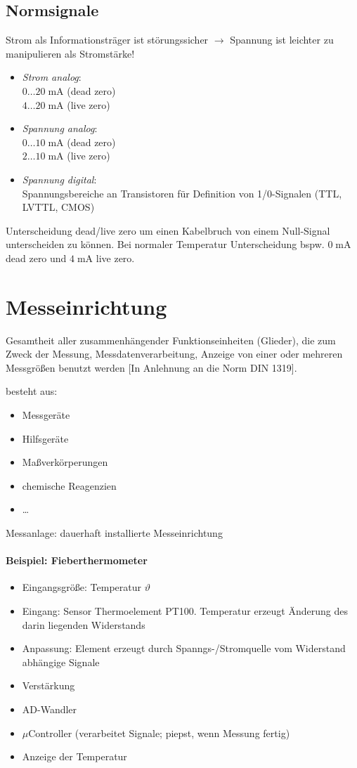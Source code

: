 \subsection{Normsignale}
Strom als Informationsträger ist störungssicher $\to$ Spannung ist leichter zu manipulieren als Stromstärke!
\begin{itemize}
\item \emph{Strom analog}:\\
$0\dots 20\; \mathrm{mA}$ (dead zero)\\
$4 \dots 20 \;\mathrm{mA}$ (live zero)
\item \emph{Spannung analog}:\\
$0\dots 10 \;\mathrm{mA}$ (dead zero)\\
$2 \dots 10 \;\mathrm{mA}$ (live zero)
\item \emph{Spannung digital}:\\
Spannungsbereiche an Transistoren für Definition von 1/0-Signalen (TTL, LVTTL, CMOS)
\end{itemize}
Unterscheidung dead/live zero um einen Kabelbruch von einem Null-Signal unterscheiden zu können. Bei normaler Temperatur Unterscheidung bspw. $0\;\mathrm{mA}$ dead zero und $4 \;\mathrm{mA}$ live zero.

\section{Messeinrichtung}
Gesamtheit aller zusammenhängender Funktionseinheiten (Glieder), die zum Zweck der Messung, Messdatenverarbeitung, Anzeige von einer oder mehreren Messgrößen benutzt werden [In Anlehnung an die Norm DIN 1319].

besteht aus:
\begin{itemize}
\item Messgeräte
\item Hilfsgeräte
\item Maßverkörperungen
\item chemische Reagenzien
\item …
\end{itemize}
Messanlage: dauerhaft installierte Messeinrichtung

\paragraph{Beispiel: Fieberthermometer}
\begin{itemize}
\item Eingangsgröße: Temperatur $\vartheta$
\item Eingang: Sensor Thermoelement PT100. Temperatur erzeugt Änderung des darin liegenden Widerstands 
\item Anpassung: Element erzeugt durch Spanngs-/Stromquelle vom Widerstand abhängige Signale
\item Verstärkung
\item AD-Wandler
\item $\mu$Controller (verarbeitet Signale; piepst, wenn Messung fertig)
\item Anzeige der Temperatur
\end{itemize}
